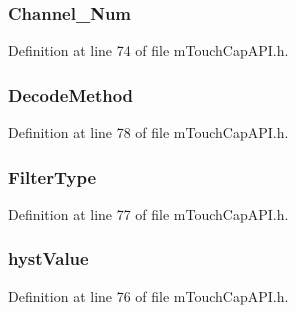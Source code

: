 \subsubsection[{Channel\+\_\+\+Num}]{ Channel\+\_\+\+Num}\label{struct_d_i_r_e_c_t_k_e_y_a721a327a1eadc121c365ecfca898972d}


Definition at line 74 of file m\+Touch\+Cap\+A\+P\+I.\+h.

\hypertarget{struct_d_i_r_e_c_t_k_e_y_a3ec50eb50f016432fd63460deb50d4d3}{}
\subsubsection[{Decode\+Method}]{ Decode\+Method}\label{struct_d_i_r_e_c_t_k_e_y_a3ec50eb50f016432fd63460deb50d4d3}


Definition at line 78 of file m\+Touch\+Cap\+A\+P\+I.\+h.

\hypertarget{struct_d_i_r_e_c_t_k_e_y_a3ed3b2bb276c531333666858f705a254}{}
\subsubsection[{Filter\+Type}]{ Filter\+Type}\label{struct_d_i_r_e_c_t_k_e_y_a3ed3b2bb276c531333666858f705a254}


Definition at line 77 of file m\+Touch\+Cap\+A\+P\+I.\+h.

\hypertarget{struct_d_i_r_e_c_t_k_e_y_aee26e696540c8197e148cb9f0ccd4551}{}
\subsubsection[{hyst\+Value}]{ hyst\+Value}\label{struct_d_i_r_e_c_t_k_e_y_aee26e696540c8197e148cb9f0ccd4551}


Definition at line 76 of file m\+Touch\+Cap\+A\+P\+I.\+h.

